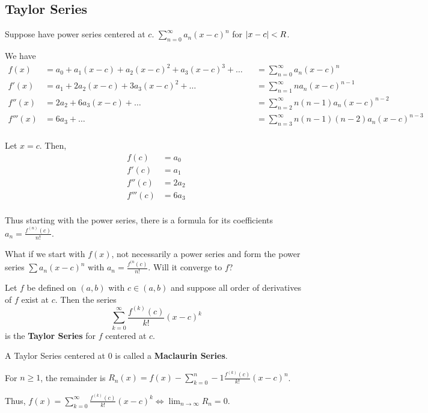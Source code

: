 \documentclass{article}
\begin{document}
      \subsection{Taylor Series}
      \begin{remark}
        Suppose have power series centered at $c$. $\sum_{n=0}^\infty a_n(x-c)^n$ for $\abs{x-c} < R$.

        We have
        \begin{align*}
          f(x) &= a_0 + a_1(x-c) + a_2(x-c)^2 + a_3(x-c)^3 + \dots &&= \sum_{n=0}^\infty a_n(x-c)^n\\
          f'(x) &= a_1 + 2a_2(x-c) + 3a_3(x-c)^2 + \dots &&= \sum_{n=1}^\infty na_n(x-c)^{n-1}\\
          f''(x) &= 2a_2 + 6a_3(x-c) + \dots &&= \sum_{n=2}^\infty n(n-1)a_n(x-c)^{n-2}\\
          f'''(x) &= 6a_3 + \dots &&= \sum_{n=3}^\infty n(n-1)(n-2)a_n(x-c)^{n-3}\\
        \end{align*}

        Let $x=c$. Then,
        \begin{align*}
          f(c) &= a_0\\
          f'(c) &= a_1\\
          f''(c) &= 2a_2\\
          f'''(c) &= 6a_3\\
        \end{align*}

        Thus starting with the power series, there is a formula for its coefficients $a_n = \frac{f^{(n)}(c)}{n!}$.

        What if we start with $f(x)$, not necessarily a power series and form the power series $\sum a_n(x-c)^n$ with $a_n = \frac{f^{(n}(c)}{n!}$. Will it converge to $f$?
        \end{remark}
        \begin{definition}
          Let $f$ be defined on $(a, b)$ with $c \in (a, b)$ and suppose all order of derivatives of $f$ exist at $c$. Then the series \[
            \sum_{k=0}^\infty \frac{f^{(k)}(c)}{k!}(x-c)^k
          \] is the \textbf{Taylor Series} for $f$ centered at $c$.

          A Taylor Series centered at $0$ is called a \textbf{Maclaurin Series}.

          For $n \geq 1$, the remainder is $R_n(x) = f(x) - \sum_{k=0}^n-1 \frac{f^{(k)}(c)}{k!}(x-c)^n$.

          Thus, $f(x) = \sum_{k=0}^\infty \frac{f^{(k)}(c)}{k!}(x-c)^k \iff \lim_{n\to\infty} R_n = 0$.
        \end{definition}
\end{document}

